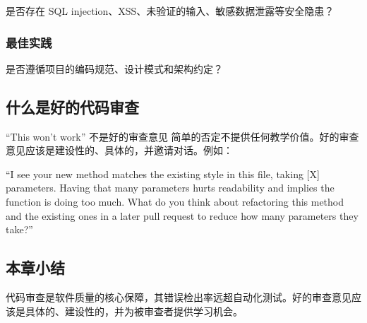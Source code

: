 是否存在 SQL injection、XSS、未验证的输入、敏感数据泄露等安全隐患？

\subsubsection{最佳实践}

是否遵循项目的编码规范、设计模式和架构约定？

\subsection{什么是好的代码审查}

\begin{warningbox}{``This won't work'' 不是好的审查意见}
简单的否定不提供任何教学价值。好的审查意见应该是建设性的、具体的，并邀请对话。例如：

``I see your new method matches the existing style in this file, taking {[}X{]} parameters. Having that many parameters hurts readability and implies the function is doing too much. What do you think about refactoring this method and the existing ones in a later pull request to reduce how many parameters they take?''
\end{warningbox}

\subsection{本章小结}

代码审查是软件质量的核心保障，其错误检出率远超自动化测试。好的审查意见应该是具体的、建设性的，并为被审查者提供学习机会。

